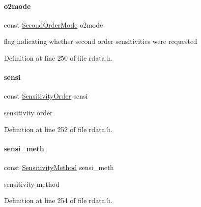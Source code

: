\mbox{\label{classamici_1_1_return_data_acc235cad50283f7891e2d834f1cbeb90}} 
\paragraph{\texorpdfstring{o2mode}{o2mode}}
{\footnotesize\ttfamily const \mbox{\hyperlink{namespaceamici_a2d77779286167d5603a870bf9f6c21ba}{Second\+Order\+Mode}} o2mode}

flag indicating whether second order sensitivities were requested 

Definition at line 250 of file rdata.\+h.

\mbox{\label{classamici_1_1_return_data_ae273fd99697cf0308e7471d822c22d7f}} 
\paragraph{\texorpdfstring{sensi}{sensi}}
{\footnotesize\ttfamily const \mbox{\hyperlink{namespaceamici_aaa03ec2f8c4d5323b98d71134a462fda}{Sensitivity\+Order}} sensi}

sensitivity order 

Definition at line 252 of file rdata.\+h.

\mbox{\label{classamici_1_1_return_data_ab761d3023398d7f741a0cfc342dc29f5}} 
\paragraph{\texorpdfstring{sensi\+\_\+meth}{sensi\_meth}}
{\footnotesize\ttfamily const \mbox{\hyperlink{namespaceamici_aa0fa493529f6872e7e776b91fbbf38f9}{Sensitivity\+Method}} sensi\+\_\+meth}

sensitivity method 

Definition at line 254 of file rdata.\+h.

